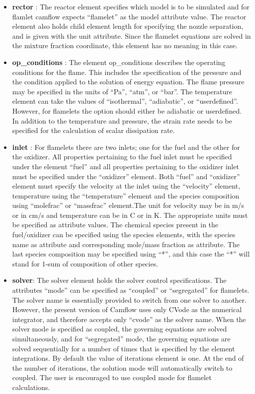 \begin{itemize}
 \item \textbf{rector} : The reactor element specifies which model is to be simulated and for flamlet camflow expects ``flamelet'' as the model attribute value. The reactor element also holds child element length for specifying the nozzle separation, and is given with the unit attribute. Since the flamelet equations are solved in the mixture fraction coordinate, this element has no meaning in this case.

\item \textbf{op\_conditions} : The element op\_conditions describes the operating conditions for the flame. This includes the specification of the pressure and the condition applied to the solution of energy equation. The flame pressure may be specified in the units of ``Pa'', ``atm'', or ``bar''. The temperature element can take the values of ``isothermal'', ``adiabatic'', or ``userdefined''. However, for flamelets the option should either be adiabatic or userdefined.\\

In addition to the temperature and pressure, the strain rate needs to be specified for the calculation of scalar dissipation rate.

\item \textbf{inlet} : For flamelets there are two inlets; one for the fuel and the other for the oxidizer. All properties pertaining to the fuel inlet must be specified under the element ``fuel'' and all properties pertaining to the oxidizer inlet must be specified under the ``oxidizer'' element. Both ``fuel'' and ``oxidizer'' element must specify the velocity at the inlet using the ``velocity'' element, temperature using the ``temperature'' element and the species composition using ``molefrac'' or ``massfrac'' element.The unit for velocity may be in m/s or in cm/s and temperature can be in C or in K. The appropriate units must be specified as attribute values. The chemical species present in the fuel/oxidizer can be specified using the species elements, with the species name as attribute and corresponding mole/mass fraction as attribute. The last species composition may be specified using ``*'', and this case the ``*'' will stand for 1-sum of composition of other species. 

\item \textbf{solver}: The solver element holds the solver control specifications. The attributes ``mode'' can be specified as ``coupled'' or ``segregated'' for flamelets. The solver name is essentially provided to switch from one solver to another. However, the present version of Camflow uses only CVode as the numerical integrator, and therefore accepts only ``cvode'' as the solver name. When the solver mode is specified as coupled, the governing equations are solved simultaneously, and for ``segregated'' mode, the governing equations are solved sequentially for a number of times that is specified by the element integrations. By default the value of iterations element is one. At the end of the number of iterations, the solution mode will automatically switch to coupled. The user is encouraged to use coupled mode for flamelet calculations.\\


\end{itemize}
